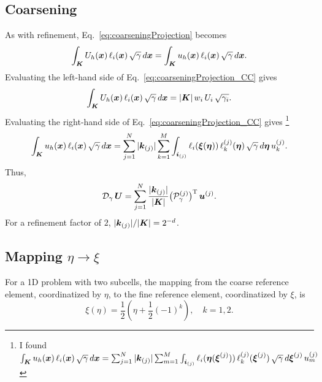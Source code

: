 \documentclass[10pt]{article}
\newcommand{\trans}{\textsc{T}}
\begin{document}
\subsection{Coarsening}

As with refinement, Eq.~\eqref{eq:coarseningProjection} becomes
\begin{equation}
  \int_{\boldsymbol{K}}U_{h}(\boldsymbol{x})\,\ell_{i}(\boldsymbol{x})\,\sqrt{\gamma}\,d\boldsymbol{x}
  =\int_{\boldsymbol{K}}u_{h}(\boldsymbol{x})\,\ell_{i}(\boldsymbol{x})\,\sqrt{\gamma}\,d\boldsymbol{x}.
  \label{eq:coarseningProjection_CC}
\end{equation}
Evaluating the left-hand side of Eq.~\eqref{eq:coarseningProjection_CC} gives
\begin{equation}
  \int_{\boldsymbol{K}}U_{h}(\boldsymbol{x})\,\ell_{i}(\boldsymbol{x})\,\sqrt{\gamma}\,d\boldsymbol{x}
  =|\boldsymbol{K}|\,w_{i}\,U_{i}\,\sqrt{\gamma_{i}}.
\end{equation}
Evaluating the right-hand side of Eq.~\eqref{eq:coarseningProjection_CC} gives
\footnote{I found $\int_{\boldsymbol{K}}u_{h}(\boldsymbol{x})\,\ell_{i}(\boldsymbol{x})\,\sqrt{\gamma}\,d\boldsymbol{x}
  =\sum_{j=1}^{N}|\boldsymbol{k}_{(j)}|\sum_{m=1}^{M}\int_{\boldsymbol{i}_{(j)}}\ell_{i}(\boldsymbol{\eta}(\boldsymbol{\xi}^{\left(j\right)}))\,\ell_{k}^{\left(j\right)}(\boldsymbol{\xi}^{\left(j\right)})\,\sqrt{\gamma}\,d\boldsymbol{\xi}^{\left(j\right)}\,u_{m}^{(j)}$}
\begin{equation}
  \int_{\boldsymbol{K}}u_{h}(\boldsymbol{x})\,\ell_{i}(\boldsymbol{x})\,\sqrt{\gamma}\,d\boldsymbol{x}
  =\sum_{j=1}^{N}|\boldsymbol{k}_{(j)}|\sum_{k=1}^{M}\int_{\boldsymbol{i}_{(j)}}\ell_{i}(\boldsymbol{\xi}(\boldsymbol{\eta}))\,\ell_{k}^{\left(j\right)}(\boldsymbol{\eta})\,\sqrt{\gamma}\,d\boldsymbol{\eta}\,u_{k}^{(j)}.
\end{equation}
Thus,
\begin{equation}
  \mathcal{D}_{\gamma}\,\vect{U}=\sum_{j=1}^{N}\f{|\vect{k}_{(j)}|}{|\vect{K}|}
  \big(\mathcal{P}_{\gamma}^{(j)}\big)^{\trans}\,\vect{u}^{(j)}.
\end{equation}
For a refinement factor of $2$, $|\boldsymbol{k}_{(j)}|/|\boldsymbol{K}|=2^{-d}$.

\subsection{Mapping $\eta\rightarrow\xi$}
For a 1D problem with two subcells, the mapping from the coarse reference element, coordinatized
by $\eta$, to the fine reference element, coordinatized by $\xi$, is
\begin{equation}
\xi\left(\eta\right)=\frac{1}{2}\left(\eta+\frac{1}{2}\left(-1\right)^{k}\right),\hspace{1em}k=1,2.
\end{equation}



\end{document}

